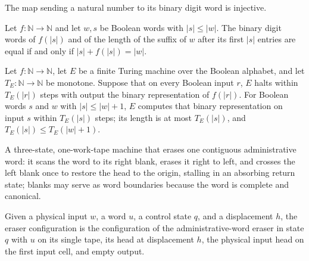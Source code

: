 \begin{lemma}
\label{Turing.FinTM.emitter_bits_injective}
\leanok
{}
The map sending a natural number to its binary digit word is injective.
\end{lemma}

\begin{lemma}
\label{Turing.FinTM.emitter_binary_check}
\leanok
{}
Let $f:\mathbb{N}\to\mathbb{N}$ and let $w,s$ be Boolean words with $|s|\le |w|$. The
binary digit words of $f(|s|)$ and of the length of the suffix of $w$ after its first
$|s|$ entries are equal if and only if $|s|+f(|s|)=|w|$.
\end{lemma}

\begin{lemma}
\label{Turing.FinTM.emitter_width_budget}
\leanok
{}
Let $f:\mathbb{N}\to\mathbb{N}$, let $E$ be a finite Turing machine over the Boolean
alphabet, and let $T_E:\mathbb{N}\to\mathbb{N}$ be monotone. Suppose that on every
Boolean input $r$, $E$ halts within $T_E(|r|)$ steps with output the binary
representation of $f(|r|)$. For Boolean words $s$ and $w$ with $|s|\le |w|+1$, $E$
computes that binary representation on input $s$ within $T_E(|s|)$ steps; its length is
at most $T_E(|s|)$, and $T_E(|s|)\le T_E(|w|+1)$.
\end{lemma}

\begin{definition}
\label{Turing.FinTM.emitterP2EraseTM}
\leanok
{}
A three-state, one-work-tape machine that erases one contiguous
administrative word: it scans the word to its right blank, erases it right
to left, and crosses the left blank once to restore the head to the origin,
stalling in an absorbing return state; blanks may serve as word boundaries
because the word is complete and canonical.
\end{definition}

\begin{definition}
\label{Turing.FinTM.emitterP2EraseCfg}
\leanok
{}
Given a physical input $w$, a word $u$, a control state $q$, and a
displacement $h$, the eraser configuration is the configuration of the
administrative-word eraser in state $q$ with $u$ on its single tape, its
head at displacement $h$, the physical input head on the first input cell,
and empty output.
\end{definition}

